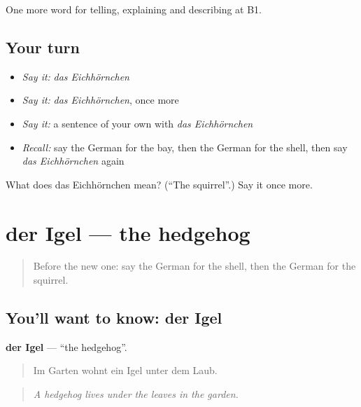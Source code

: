 \begin{grammarlens}[title={What you've built}]
One more word for telling, explaining and describing at B1.
\end{grammarlens}

\subsection*{Your turn}
\begin{itemize}
\raggedright
  \item \emph{Say it:} \emph{das Eichhörnchen}
  \item \emph{Say it:} \emph{das Eichhörnchen}, once more
  \item \emph{Say it:} a sentence of your own with \emph{das Eichhörnchen}
  \item \emph{Recall:} say the German for the bay, then the German for the shell, then say \emph{das Eichhörnchen} again
\end{itemize}

\begin{tcolorbox}[breakable,colback=teal!4,colframe=teal!35!black,title={Before you move on}]
What does das Eichhörnchen mean? (\textquotedblleft{}The squirrel\textquotedblright{}.) Say it once more.
\end{tcolorbox}
\section[der Igel]{der Igel — the hedgehog}

\label{lesson:GE-C458-igel}



\begin{quote}
Before the new one: say the German for the shell, then the German for the squirrel.
\end{quote}

\subsection*{You'll want to know: der Igel}
\textbf{der Igel} — \textquotedblleft{}the hedgehog\textquotedblright{}.

\begin{quote}
Im Garten wohnt ein Igel unter dem Laub.
\end{quote}

\begin{quote}
\emph{A hedgehog lives under the leaves in the garden.}
\end{quote}

